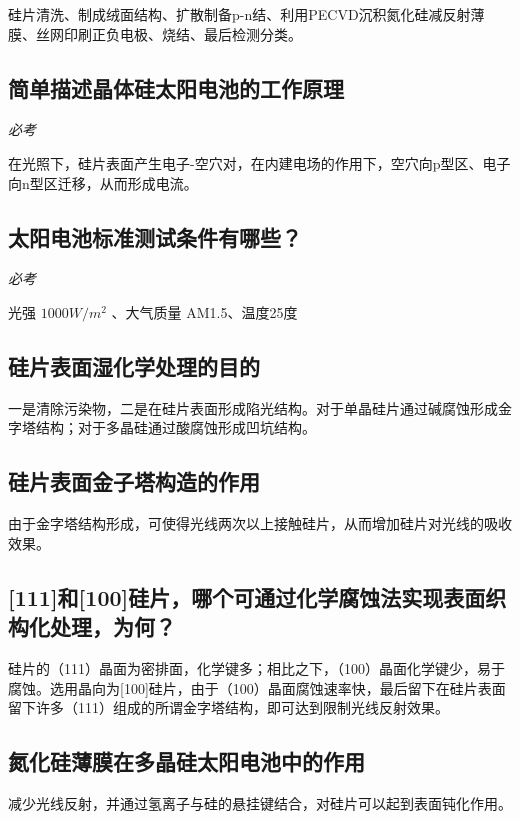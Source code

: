 \documentclass{article}
\begin{document}
硅片清洗、制成绒面结构、扩散制备p-n结、利用PECVD沉积氮化硅减反射薄膜、丝网印刷正负电极、烧结、最后检测分类。

\subsection{简单描述晶体硅太阳电池的工作原理}

\emph{必考}

  在光照下，硅片表面产生电子-空穴对，在内建电场的作用下，空穴向p型区、电子向n型区迁移，从而形成电流。
  
\subsection{太阳电池标准测试条件有哪些？}

\emph{必考}

光强 $1000 W/m^2$ 、大气质量 AM1.5、温度25度

\subsection{硅片表面湿化学处理的目的}

一是清除污染物，二是在硅片表面形成陷光结构。对于单晶硅片通过碱腐蚀形成金字塔结构；对于多晶硅通过酸腐蚀形成凹坑结构。

\subsection{硅片表面金子塔构造的作用}

由于金字塔结构形成，可使得光线两次以上接触硅片，从而增加硅片对光线的吸收效果。

\subsection{[111]和[100]硅片，哪个可通过化学腐蚀法实现表面织构化处理，为何？}

 硅片的（111）晶面为密排面，化学键多；相比之下，（100）晶面化学键少，易于腐蚀。选用晶向为[100]硅片，由于（100）晶面腐蚀速率快，最后留下在硅片表面留下许多（111）组成的所谓金字塔结构，即可达到限制光线反射效果。

\subsection{氮化硅薄膜在多晶硅太阳电池中的作用}

减少光线反射，并通过氢离子与硅的悬挂键结合，对硅片可以起到表面钝化作用。
\end{document}
